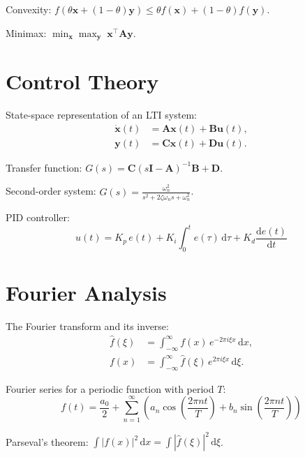 \documentclass[
    language=english,
    doctype=article,
    institution=none,
    titlestyle=book,
]{../../omnilatex}
\theoremstyle{plain}
\theoremstyle{definition}
\theoremstyle{remark}
\begin{document}
Convexity: $f(\theta\mathbf{x} + (1-\theta)\mathbf{y}) \leq \theta f(\mathbf{x}) + (1-\theta) f(\mathbf{y})$.

Minimax: $\min_{\mathbf{x}} \max_{\mathbf{y}} \; \mathbf{x}^{\top} \mathbf{A} \mathbf{y}$.

\section{Control Theory}
\label{sec:control-theory}

State-space representation of an LTI system:
\begin{align}
    \dot{\mathbf{x}}(t) &= \mathbf{A}\mathbf{x}(t) + \mathbf{B}\mathbf{u}(t), \label{eq:state-space}\\
    \mathbf{y}(t) &= \mathbf{C}\mathbf{x}(t) + \mathbf{D}\mathbf{u}(t). \label{eq:output}
\end{align}

Transfer function: $G(s) = \mathbf{C}(s\mathbf{I} - \mathbf{A})^{-1}\mathbf{B} + \mathbf{D}$.

Second-order system: $G(s) = \frac{\omega_n^2}{s^2 + 2\zeta\omega_n s + \omega_n^2}$.

PID controller:
\[
    u(t) = K_p\, e(t) + K_i \int_0^t e(\tau)\,\mathup{d}\tau + K_d \frac{\mathup{d}e(t)}{\mathup{d}t}
\]

\section{Fourier Analysis}
\label{sec:fourier}

The Fourier transform and its inverse:
\begin{align}
    \hat{f}(\xi) &= \int_{-\infty}^{\infty} f(x)\, e^{-2\pi i \xi x}\,\mathup{d}x, \label{eq:fourier}\\
    f(x) &= \int_{-\infty}^{\infty} \hat{f}(\xi)\, e^{2\pi i \xi x}\,\mathup{d}\xi. \label{eq:inverse-fourier}
\end{align}

Fourier series for a periodic function with period $T$:
\[
    f(t) = \frac{a_0}{2} + \sum_{n=1}^{\infty} \left(
        a_n \cos\!\left(\frac{2\pi n t}{T}\right) + b_n \sin\!\left(\frac{2\pi n t}{T}\right)
    \right)
\]

Parseval's theorem: $\int |f(x)|^2\,\mathup{d}x = \int |\hat{f}(\xi)|^2\,\mathup{d}\xi$.
\end{document}
